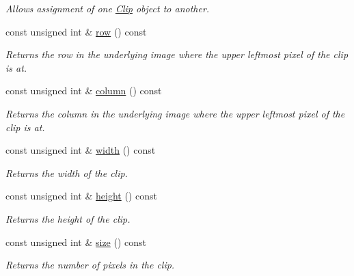 \begin{CompactItemize}
\begin{CompactList}\small\item\em Allows assignment of one \hyperlink{class_clip}{Clip} object to another. \item\end{CompactList}\item 
const unsigned int \& \hyperlink{class_clip_1a1d1fd626d1325f0f2b9184de4c89b8}{row} () const 
\begin{CompactList}\small\item\em Returns the row in the underlying image where the upper leftmost pixel of the clip is at. \item\end{CompactList}\item 
const unsigned int \& \hyperlink{class_clip_06a34378fa0f23425d10bb04e9972a26}{column} () const 
\begin{CompactList}\small\item\em Returns the column in the underlying image where the upper leftmost pixel of the clip is at. \item\end{CompactList}\item 
const unsigned int \& \hyperlink{class_clip_88d1a47c0ec077e8c6680785509389b0}{width} () const 
\begin{CompactList}\small\item\em Returns the width of the clip. \item\end{CompactList}\item 
const unsigned int \& \hyperlink{class_clip_939908a8dde602d25335792cc0fd5d97}{height} () const 
\begin{CompactList}\small\item\em Returns the height of the clip. \item\end{CompactList}\item 
const unsigned int \& \hyperlink{class_clip_eb6b12a1a0570b529d6a09633b991fcd}{size} () const 
\begin{CompactList}\small\item\em Returns the number of pixels in the clip. \item\end{CompactList}\end{CompactItemize}
